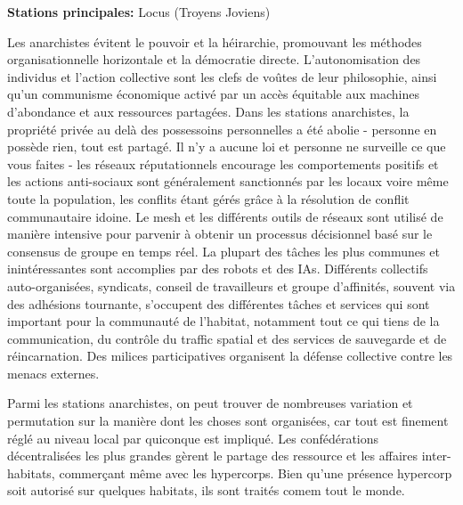                                  \textbf{Stations principales:} Locus (Troyens Joviens) 

                                 Les anarchistes évitent le pouvoir et la héirarchie, promouvant les méthodes organisationnelle horizontale et la démocratie directe. L'autonomisation des individus et l'action collective sont les clefs de voûtes de leur philosophie, ainsi qu'un communisme économique activé par un accès équitable aux machines d'abondance et aux ressources partagées. Dans les stations anarchistes, la propriété privée au delà des possessoins personnelles a été abolie - personne en possède rien, tout est partagé. Il n'y a aucune loi et personne ne surveille ce que vous faites - les réseaux réputationnels encourage les comportements positifs et les actions anti-sociaux sont généralement sanctionnés par les locaux voire même toute la population, les conflits étant gérés grâce à la résolution de conflit communautaire idoine. Le mesh et les différents outils de réseaux sont utilisé de manière intensive pour parvenir à obtenir un processus décisionnel basé sur le consensus de groupe en temps réel. La plupart des tâches les plus communes et inintéressantes sont accomplies par des robots et des IAs. Différents collectifs auto-organisées, syndicats, conseil de travailleurs et groupe d'affinités, souvent via des adhésions tournante, s'occupent des différentes tâches et services qui sont important pour la communauté de l'habitat, notamment tout ce qui tiens de la communication, du contrôle du traffic spatial et des services de sauvegarde et de réincarnation. Des milices participatives organisent la défense collective contre les menacs externes. 

                                 Parmi les stations anarchistes, on peut trouver de nombreuses variation et permutation sur la manière dont les choses sont organisées, car tout est finement réglé au niveau local par quiconque est impliqué. Les confédérations décentralisées les plus grandes gèrent le partage des ressource et les affaires inter-habitats, commerçant même avec les hypercorps. Bien qu'une présence hypercorp soit autorisé sur quelques habitats, ils sont traités comem tout le monde. 

